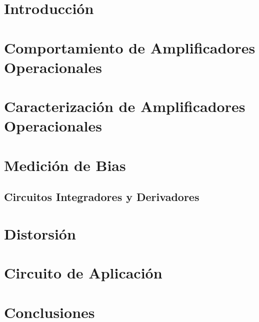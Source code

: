 







\section{Introducción}


\section{Comportamiento de Amplificadores Operacionales}

	

\section{Caracterización de Amplificadores Operacionales}

	

\section{Medición de Bias}

	

\subsection{Circuitos Integradores y Derivadores}

	

\section{Distorsión}

	

\section{Circuito de Aplicación}

	
	

\section{Conclusiones}


